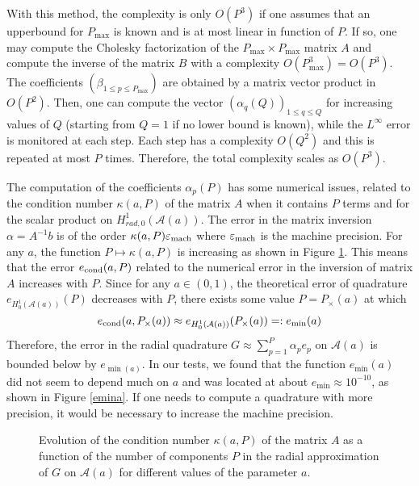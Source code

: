 \documentclass[11pt,a4paper]{article}
\begin{document}
With this method, the complexity is only $O(P^3)$ if one assumes that an upperbound for $P_{\max}$ is known and is at most linear in function of $P$. If so, one may compute the Cholesky factorization of the $P_{\max} \times P_{\max}$ matrix $A$ and compute the inverse of the matrix $B$ with a complexity $O(P_{\max}^3) = O(P^3)$. The coefficients $(\beta_{1 \leq p \leq P_{\max}})$ are obtained by a matrix vector product in $O(P^2)$. Then, one can compute the vector $(\alpha_q(Q))_{1 \leq q \leq Q}$ for increasing values of $Q$ (starting from $Q = 1$ if no lower bound is known), while the $L^{\infty}$ error is monitored at each step. Each step has a complexity $O(Q^2)$ and this is repeated at most $P$ times. Therefore, the total complexity scales as $O(P^3)$. 
\begin{Rem} The computation of the coefficients $\alpha_p(P)$ has some numerical issues, related to the condition number $\kappa(a,P)$ of the matrix $A$ when it contains $P$ terms and for the scalar product on $H^1_{rad,0}(\mathcal{A}(a))$. The error in the matrix inversion $\alpha = A^{-1}b$ is of the order $\kappa(a,P) \varepsilon_{\textup{mach}}$ where $\varepsilon_{\textup{mach}}$ is the machine precision. For any $a$, the function $P \mapsto \kappa(a,P)$ is increasing as shown in Figure \ref{ConditionNumIncrease}. This means that the error $e_{\textup{cond}}(a,P)$ related to the numerical error in the inversion of matrix $A$ increases with $P$. Since for any $a \in (0,1)$, the theoretical error of quadrature $e_{H_0^1(\mathcal{A}(a))}(P)$ decreases with $P$, there exists some value $P = P_{\times}(a)$ at which 
\[e_{\textup{cond}}(a,P_{\times}(a)) \approx  e_{H_0^1(\mathcal{A}(a))}(P_{\times}(a)) =: e_{\min}(a)\]
Therefore, the error in the radial quadrature $G \approx \sum_{p=1}^P {\alpha_p e_p}$ on $\mathcal{A}(a)$ is bounded below by $e_{\min(a)}$. 
In our tests, we found that the function $e_{\min}(a)$ did not seem to depend much on $a$ and was located at about $e_{\min} \approx 10^{-10}$, as shown in Figure \ref{emina}. If one needs to compute a quadrature with more precision, it would be necessary to increase the machine precision. 
\end{Rem}


\begin{figure}[H]
\centering 

\caption{Evolution of the condition number $\kappa(a,P)$ of the matrix $A$ as a function of the number of components $P$ in the radial approximation of $G$ on $\mathcal{A}(a)$ for different values of the parameter $a$.}
\label{ConditionNumIncrease}
\end{figure}
\end{document}
